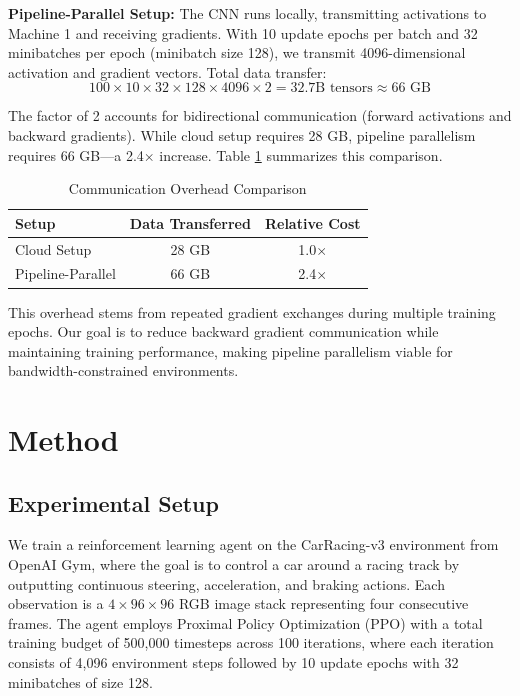 \documentclass[conference]{IEEEtran}
\begin{document}
\textbf{Pipeline-Parallel Setup:} The CNN runs locally, transmitting activations to Machine 1 and receiving gradients. With 10 update epochs per batch and 32 minibatches per epoch (minibatch size 128), we transmit 4096-dimensional activation and gradient vectors. Total data transfer:
\begin{equation}
100 \times 10 \times 32 \times 128 \times 4096 \times 2 = 32.7\text{B tensors} \approx 66\text{ GB}
\end{equation}

The factor of 2 accounts for bidirectional communication (forward activations and backward gradients). While cloud setup requires 28 GB, pipeline parallelism requires 66 GB—a 2.4$\times$ increase. Table \ref{tab:data_transfer} summarizes this comparison.

\begin{table}[htbp]
\caption{Communication Overhead Comparison}
\begin{center}
\begin{tabular}{|l|c|c|}
\hline
\textbf{Setup} & \textbf{Data Transferred} & \textbf{Relative Cost} \\
\hline
Cloud Setup & 28 GB & 1.0$\times$ \\
Pipeline-Parallel & 66 GB & 2.4$\times$ \\
\hline
\end{tabular}
\label{tab:data_transfer}
\end{center}
\end{table}

This overhead stems from repeated gradient exchanges during multiple training epochs. Our goal is to reduce backward gradient communication while maintaining training performance, making pipeline parallelism viable for bandwidth-constrained environments.

\section{Method}

\subsection{Experimental Setup}

We train a reinforcement learning agent on the CarRacing-v3 environment from OpenAI Gym, where the goal is to control a car around a racing track by outputting continuous steering, acceleration, and braking actions. Each observation is a $4 \times 96 \times 96$ RGB image stack representing four consecutive frames. The agent employs Proximal Policy Optimization (PPO) with a total training budget of 500,000 timesteps across 100 iterations, where each iteration consists of 4,096 environment steps followed by 10 update epochs with 32 minibatches of size 128.
\end{document}
